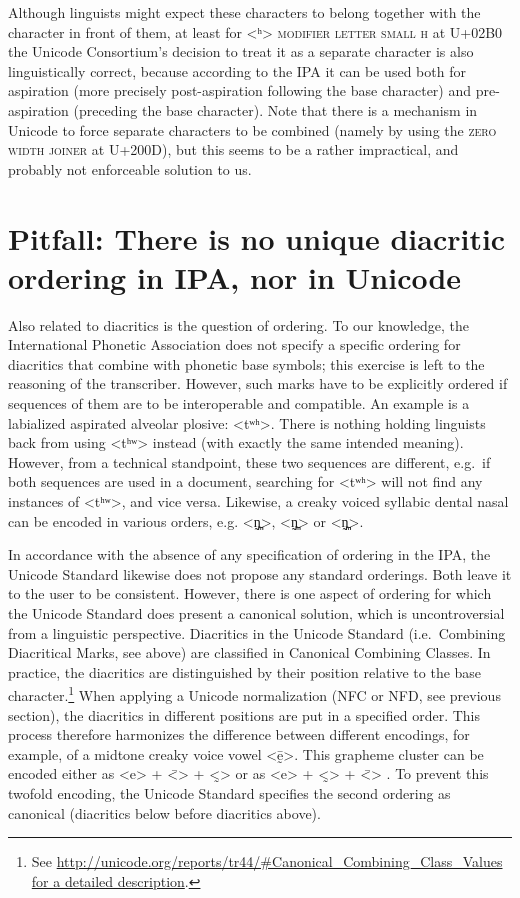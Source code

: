 Although linguists might expect these characters to belong together with the character in front of them, at least for <ʰ> \textsc{modifier letter small h} at U+02B0 the Unicode Consortium's decision to treat it as a separate character is also linguistically correct, because according to the IPA it can be used both for aspiration (more precisely post-aspiration following the base character) and pre-aspiration (preceding the base character). Note that there is a mechanism in Unicode to force separate characters to be combined (namely by using the \textsc{zero width joiner} at U+200D), but this seems to be a rather impractical, and probably not enforceable solution to us.

\section{Pitfall: There is no unique diacritic ordering in IPA, nor in Unicode}
\label{pitfall-neither-the-ipa-nor-the-unicode-standard-enforce-a-unique-diacritic-ordering}

Also related to diacritics is the question of ordering. To our knowledge, the International Phonetic Association does not specify a specific ordering for diacritics that combine with phonetic base symbols; this exercise is left to the reasoning of the transcriber. However, such marks have to be explicitly ordered if sequences of them are to be interoperable and compatible. An example is a labialized aspirated alveolar plosive: <tʷʰ>. There is nothing holding linguists back from using <tʰʷ> instead (with exactly the same intended meaning). However, from a technical standpoint, these two sequences are different, e.g.~if both sequences are used in a document, searching for <tʷʰ> will not find any instances of <tʰʷ>, and vice versa. Likewise, a creaky voiced syllabic dental nasal can be encoded in various orders, e.g. <n̪̰̩>, <n̩̰̪> or <n̩̪̰>.

In accordance with the absence of any specification of ordering in the IPA, the Unicode Standard likewise does not propose any standard orderings. Both leave it to the user to be consistent. However, there is one aspect of ordering for which the Unicode Standard does present a canonical solution, which is uncontroversial from a linguistic perspective. Diacritics in the Unicode Standard (i.e.~Combining Diacritical Marks, see above) are classified in Canonical Combining Classes. In practice, the diacritics are distinguished by their position relative to the base character.\footnote{See \url{http://unicode.org/reports/tr44/\#Canonical\_Combining\_Class\_Values for a detailed description}.} When applying a Unicode normalization (NFC or NFD, see previous section), the diacritics in different positions are put in a specified order. This process therefore harmonizes the difference between different encodings, for example, of a midtone creaky voice vowel <ḛ̄>. This grapheme cluster can be encoded either as <e> + <̄> + <̰> or as <e> + <̰> + <̄> . To prevent this twofold encoding, the Unicode Standard specifies the second ordering as canonical (diacritics below before diacritics above).

